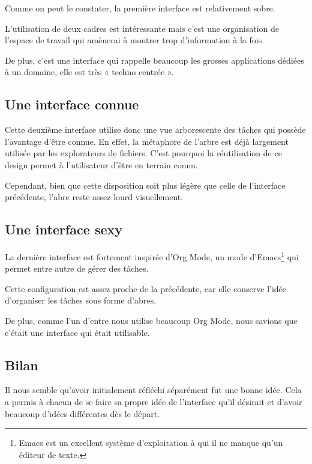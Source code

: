 \documentclass[11pt]{article}
\begin{document}
Comme on peut le constater, la première interface est relativement sobre.

L'utilisation de deux cadres est intéressante mais c'est une
organisation de l'espace de travail qui amènerai à montrer trop
d'information à la fois.

De plus, c'est une interface qui rappelle beaucoup les grosses
applications dédiées à un domaine, elle est très « techno centrée ».


\subsection{Une interface connue}


Cette deuxième interface utilise donc une vue arborescente des tâches
qui possède l'avantage d'être connue. En effet, la métaphore de
l'arbre est déjà largement utilisée par les explorateurs de fichiers.
C'est pourquoi la réutilisation de ce design permet à l'utilisateur
d'être en terrain connu.

Cependant, bien que cette disposition soit plus légère que celle de
l'interface précédente, l'abre reste assez lourd visuellement.


\subsection{Une interface sexy}


La dernière interface est fortement inspirée d'Org Mode, un mode
d'Emacs\footnote{Emacs est un excellent système d'exploitation à qui
  il ne manque qu'un éditeur de texte.} qui permet entre autre de
gérer des tâches.

Cette configuration est assez proche de la précédente, car elle
conserve l'idée d'organiser les tâches sous forme d'abres.

De plus, comme l'un d'entre nous utilise beaucoup Org Mode, nous
savions que c'était une interface qui était utilisable.


\subsection{Bilan}

Il nous semble qu'avoir initialement réfléchi séparément fut une bonne
idée. Cela a permis à chacun de se faire sa propre idée de l'interface
qu'il désirait et d'avoir beaucoup d'idées différentes dès le départ.
\end{document}

